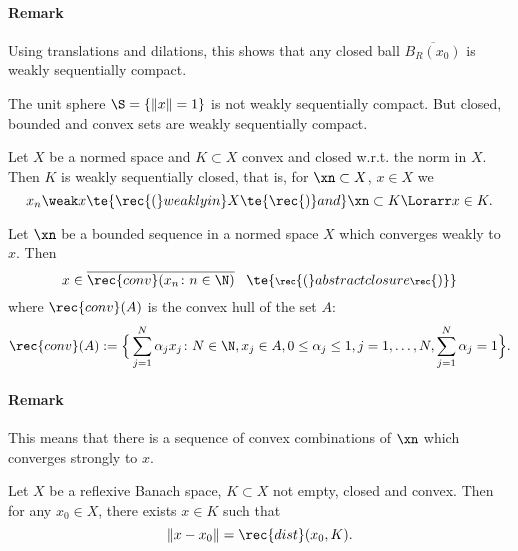 \paragraph{Remark}
Using translations and dilations, this shows that any closed ball $\overline{B_R(x_0)}$ is weakly sequentially compact.

 The unit sphere $\S=\{\|x\|=1\}$ is not weakly sequentially compact. But closed, bounded and convex sets are weakly sequentially compact.

\begin{thm}\label{viii.5}
    Let $X$ be a normed space and $K\subset X$ convex and closed \rec{(}w.r.t. the norm in $X$\rec{)}. Then $K$ is weakly sequentially closed, that is, for $\xn\subset X$, $x\in X$ we
    \[x_n\weak x\te{ \rec{(}weakly in }X\te{\rec{)} and }\xn\subset K\Lorarr x\in K.\]
\end{thm}

\begin{lem}\label{viii.6}
    Let $\xn$ be a bounded sequence in a normed space $X$ which converges weakly to $x$. Then
    \[x\in\overline{\rec{conv}(x_n\colon n\in\N)}\;\;\;\te{\scriptsize\rec{(}abstract closure\rec{)}}\]
    where $\rec{conv}(A)$ is the convex hull of the set $A$:
    \[\rec{conv}(A):=\Big\{\sum_{j=1}^N\alpha_jx_j\colon N\in\N,x_j\in A,0\leq\alpha_j\leq1,j=1,\ldots,N,\sum_{j=1}^N\alpha_j=1\Big\}.\]
\end{lem}

\paragraph{Remark}
This means that there is a sequence of convex combinations of $\xn$ which converges strongly to $x$.

\begin{thm}\label{viii.7}
    Let $X$ be a reflexive Banach space, $K\subset X$ not empty, closed and convex. Then for any $x_0\in X$, there exists $x\in K$ such that
    \[\|x-x_0\|=\rec{dist}(x_0,K).\]
\end{thm}
